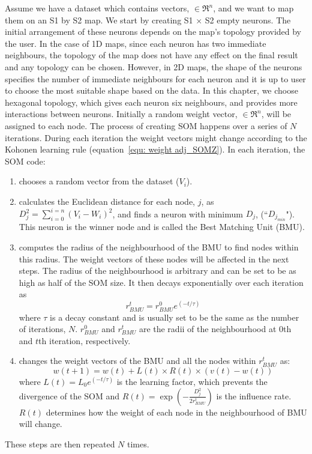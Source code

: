      Assume we have a dataset which contains vectors,  $\in \Re^n$, and we want to map them on an S1 by S2 map. 
     We start by creating S1 $\times$ S2 empty neurons. 
     The initial arrangement of these neurons depends on the map's topology provided by the user.
     In the case of 1D maps, since each neuron has two immediate neighbours, the topology of the map does not have any effect on the final result and any topology can be chosen.
     However, in 2D maps, the shape of the neurons specifies the number of immediate neighbours for each neuron and it is up to user to choose the most suitable shape based on the data.
     In this chapter, we choose hexagonal topology, which gives each neuron six neighbours, and provides more interactions between neurons.
     Initially a random weight vector,  $\in \Re^n$, will be assigned to each node.
     The process of creating SOM happens over a series of $N$ iterations. 
     During each iteration the weight vectors might change according to the Kohonen learning rule (equation~\ref{equ: weight adj_SOMZ}). 
      In each iteration, the SOM code:
     \begin{enumerate}
        \item chooses a random vector from the dataset ($V_i$).
        \item calculates the Euclidean distance for each node, $j$, as  $D_j^2= \sum_{i=0}^{i=n} (V_i - W_i)^2$, and finds a neuron with minimum $D_j$, (``$D_{j_{min}}$"). This neuron is the winner node and is called the Best Matching Unit (BMU). 
        \item computes the radius of the neighbourhood of the BMU to find nodes within this radius. The weight vectors of these nodes will be affected in the next steps. The radius of the neighbourhood is arbitrary and can be set to be as high as half of the SOM size. It then decays exponentially over each iteration as
        \begin{equation}
            r^t_{BMU} = r^0_{BMU}e^{(-t/\tau)}
        \end{equation}
        where $\tau$ is a decay constant and is usually set to be the same as the number of iterations, $N$. $r^0_{BMU}$ and $r^t_{BMU}$ are the radii of the neighbourhood at 0th and $t$th iteration, respectively. 
        \item changes the weight vectors of the BMU and all the nodes within $r^t_{BMU}$ as:
        \begin{equation}
            \label{equ: weight adj_SOMZ}
            w(t+1)=w(t)+L(t) \times R(t) \times(v(t)-w(t))
        \end{equation}
        where $L(t) = L_0 e^{(-t/\tau)}$ is the learning factor, which prevents the divergence of the SOM and $R(t)=\exp(-\frac{D_j^2}{2r^t_{BMU}})$ is the influence rate. $R(t)$ determines how the weight of each node in the neighbourhood of BMU will change.
     \end{enumerate}
     These steps are then repeated $N$ times.
     
